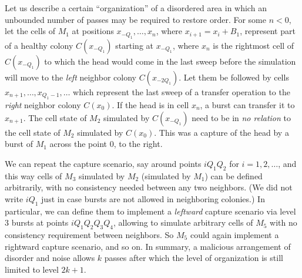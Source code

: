 \documentclass[11pt]{memoir}
\theoremstyle{definition} %
\def\B{B}
\newcommand{\Q}{Q} %
\begin{document}
\begin{example}\label{xpl:unbounded}
  Let us describe a certain ``organization'' of a disordered area in which an unbounded number of passes
  may be required to restore order.
For some \( n<0 \), let the cells of \( M_{1} \) at positions
\( x_{-\Q_{1}},\dots,x_{n} \), where \( x_{i+1}=x_{i}+\B_{1} \),
represent part of a healthy colony \( C(x_{-\Q_{1}}) \) starting at \( x_{-\Q_{1}} \), where \( x_{n} \)
is the rightmost cell of \( C(x_{-\Q_{1}}) \)
to which the head would come in the last sweep before
the simulation will move to the \emph{left} neighbor colony \( C(x_{-2\Q_{1}}) \).
Let them be followed by cells \( x_{n+1},\dots, x_{\Q_{1}-1},\dots\)
which represent the last sweep of a transfer operation to the \emph{right} neighbor colony \( C(x_{0}) \).
If the head is in cell \( x_{n} \), a burst can transfer it to \( x_{n+1} \).
The cell state of \( M_{2} \) simulated by \( C(x_{-\Q_{1}}) \) need to be in \emph{no relation} to 
the cell state of \( M_{2} \) simulated by \( C(x_{0}) \).
This was a capture of the head by a burst of \( M_{1} \) across the point 0, to the right.

We can repeat the capture scenario, say around points \( i \Q_{1}\Q_{2} \) for \( i=1,2,\dots \),
and this way cells of \( M_{3} \) simulated by \( M_{2} \) (simulated by \( M_{1} \))
can be defined arbitrarily, with no consistency needed between any two neighbors.
(We did not write \( i \Q_{1} \) just in case bursts are not allowed in neighboring colonies.)
In particular, we can define them to implement a \emph{leftward} capture scenario
via level 3 bursts at points \( i \Q_{1}\Q_{2}\Q_{3}\Q_{4} \), allowing to simulate arbitrary cells of \( M_{5} \)
with no consistency requirement between neighbors.
So \( M_{5} \) could again implement a rightward capture scenario, and so on.
In summary, a malicious arrangement of disorder and noise allows \( k \) passes
after which the level of organization is still limited to level \( 2 k + 1 \).
\end{example}
\end{document}
